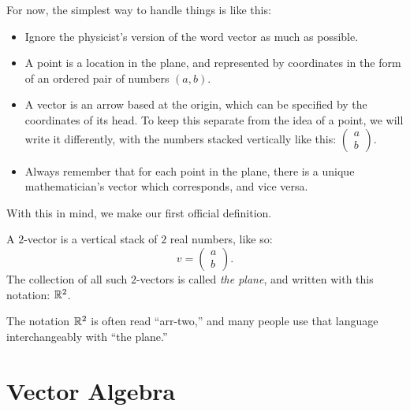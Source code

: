 \documentclass[00-livre-main.tex]{subfiles}
\begin{document}
For now, the simplest way to handle things is like this:
\begin{itemize}
\item Ignore the physicist's version of the word vector as much as possible.
\item A point is a location in the plane, and represented by coordinates in the form of an ordered pair of numbers $(a,b)$.
\item A vector is an arrow based at the origin, which can be specified by the coordinates of its head. To keep this separate from the idea of a point, we will write it differently, with the numbers stacked vertically like this: $\left(\begin{smallmatrix} a \\ b \end{smallmatrix}\right)$.
\item Always remember that for each point in the plane, there is a unique mathematician's vector which corresponds, and vice versa.
\end{itemize}
With this in mind, we make our first official definition.

\begin{definition} A $2$-vector is a vertical stack of $2$ real numbers, like so:
\[
v = \begin{pmatrix} a \\ b \end{pmatrix}.
\]
The collection of all such $2$-vectors is called \emph{the plane}, and written with this notation: $\mathbb{R}^2$.
\end{definition}

The notation $\mathbb{R}^2$ is often read ``arr-two,'' and many people use that language interchangeably with ``the plane.''

\section*{Vector Algebra}
\end{document}
